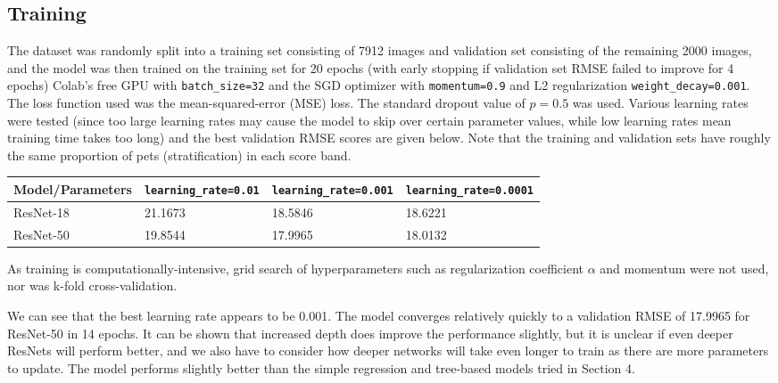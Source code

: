 \documentclass[12pt]{article}
\begin{document}
\subsection{Training}

The dataset was randomly split into a training set consisting of 7912 images and validation set consisting of the remaining 2000 images, and the model was then trained on the training set for 20 epochs (with early stopping if validation set RMSE failed to improve for 4 epochs) Colab's free GPU with \texttt{batch\_size=32} and the SGD optimizer with \texttt{momentum=0.9} and L2 regularization \texttt{weight\_decay=0.001}. The loss function used was the mean-squared-error (MSE) loss. The standard dropout value of $p=0.5$ was used. Various learning rates were tested (since too large learning rates may cause the model to skip over certain parameter values, while low learning rates mean training time takes too long) and the best validation RMSE scores are given below. Note that the training and validation sets have roughly the same proportion of pets (stratification) in each score band.\newline

\begin{center}
\begin{tabular}{ | m{3.4cm} | m{4cm}| m{4cm} | m{4cm} | } 
  \hline
  Model/Parameters & \texttt{learning\_rate=0.01} & \texttt{learning\_rate=0.001} & \texttt{learning\_rate=0.0001}\\ 
  \hline
  ResNet-18 & 21.1673 & 18.5846 & 18.6221 \\
  \hline
  ResNet-50 & 19.8544 & 17.9965 & 18.0132 \\ 
  \hline
\end{tabular}
\end{center}

As training is computationally-intensive, grid search of hyperparameters such as regularization coefficient $\alpha$ and momentum were not used, nor was k-fold cross-validation.\newline

We can see that the best learning rate appears to be 0.001. The model converges relatively quickly to a validation RMSE of 17.9965 for ResNet-50 in 14 epochs. It can be shown that increased depth does improve the performance slightly, but it is unclear if even deeper ResNets will perform better, and we also have to consider how deeper networks will take even longer to train as there are more parameters to update. The model performs slightly better than the simple regression and tree-based models tried in Section 4.
\end{document}

